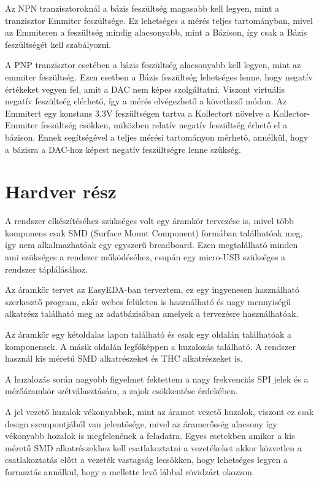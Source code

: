 Az NPN tranzisztoroknál a bázis feszültség
magasabb kell legyen, mint a tranzisztor Emmiter feszültsége.
Ez lehetséges a mérés teljes tartományban, mivel az Emmiteren a feszültség
mindig alacsonyabb, mint a Bázison, így csak a Bázis feszültségét kell
szabályozni.

A PNP tranzisztor esetében a bázis feszültség alacsonyabb kell legyen,
mint az emmiter feszültség. Ezen esetben a Bázis feszültség lehetséges 
lenne, hogy negatív értékeket vegyen fel, amit a DAC nem képes szolgáltatni.
Viszont virtuális negatív feszültség elérhető, így a mérés elvégezhető 
a következő módon. Az Emmitert egy konstans 3.3V feszültségen tartva a
Kollectort növelve a Kollector-Emmiter feszültség csökken, miközben
relatív negatív feszültség érhető el a bázison.
Ennek segítségével a teljes mérési tartományon mérhető, annélkül,
hogy a bázisra a DAC-hoz képest negatív feszültségre lenne szükség.




\section{Hardver rész}

A rendszer elkészítéséhez szükséges volt egy áramkör tervezése is, mivel több komponens
csak SMD (Surface Mount Component) formában találhatóak meg, így nem alkalmazhatóak egy
egyszerű breadboard. Ezen megtalálható minden ami szükséges a rendszer működéséhez, 
csupán egy micro-USB szükséges a rendszer táplálásához.

Az áramkör tervet az EasyEDA-ban terveztem, ez egy ingyenesen használható szerkesztő
program, akár webes felületen is használható és nagy mennyiségű alkatrész található
meg az adatbázisában amelyek a tervezésre használhatóak.

Az áramkör egy kétoldalas lapon található és csak egy oldalán találhatóak a komponensek.
A másik oldalán legfőképpen a huzalozás található. A rendszer használ kis méretű
SMD alkatrészeket és THC alkatrészeket is. 

A huzalozás során nagyobb figyelmet fektettem a nagy frekvenciás SPI jelek
és a mérőáramkör szétválasztására, a zajok csökkentése érdekében.

A jel vezető huzalok vékonyabbak, mint az áramot vezető huzalok, viszont ez csak
design szempontjából van jelentősége, mivel az áramerősség alacsony így vékonyabb
hozalok is megfelenének a feladatra. Egyes esetekben amikor a kis méretű SMD 
alkatrészekhez kell csatlakoztatni a vezetékeket akkor közvetlen a csatlakoztatás
előtt a vezeték vastagság lecsökken, hogy lehetséges legyen a forrasztás annálkül,
hogy a mellette levő lábbal rövidzárt okozzon.

